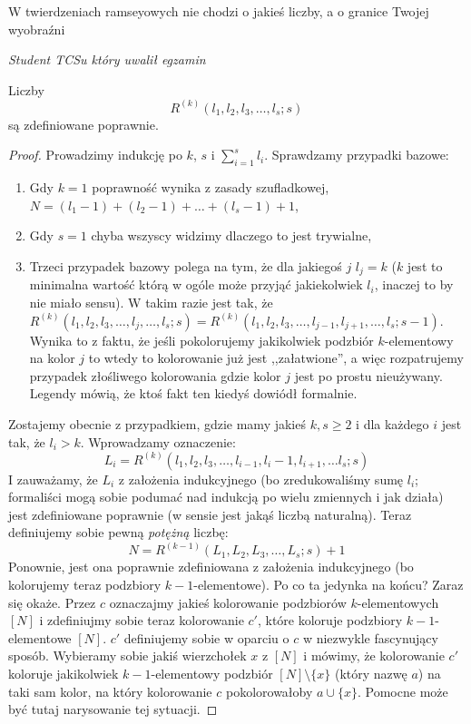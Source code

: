 \epigraph{W twierdzeniach ramseyowych nie chodzi o jakieś liczby, a o granice Twojej wyobraźni}{\textit{Student TCSu który uwalił egzamin}}
\begin{theorem}
	Liczby
	\begin{equation*}
		R^{(k)}(l_1,l_2,l_3,\dots,l_s;s)
	\end{equation*}
	są zdefiniowane poprawnie.
\end{theorem}

\begin{proof}
	Prowadzimy indukcję po $k$, $s$ i $\sum_{i=1}^{s} l_i$. Sprawdzamy przypadki bazowe:
	\begin{enumerate}
		\item Gdy $k = 1$ poprawność wynika z zasady szufladkowej, $N = (l_1 - 1) + (l_2 - 1) + \dots + (l_s - 1) + 1$,
		\item Gdy $s = 1$ chyba wszyscy widzimy dlaczego to jest trywialne,
		\item Trzeci przypadek bazowy polega na tym, że dla jakiegoś $j$ $l_j = k$ ($k$ jest to minimalna wartość którą w ogóle może przyjąć jakiekolwiek $l_i$, inaczej to by nie miało sensu). W takim razie jest tak, że $R^{(k)}(l_1,l_2,l_3,\dots,l_j,\dots,l_s;s) = R^{(k)}(l_1,l_2,l_3,\dots,l_{j-1}, l_{j+1}, \dots,l_s;s-1)$. Wynika to z faktu, że jeśli pokolorujemy jakikolwiek podzbiór $k$-elementowy na kolor $j$ to wtedy to kolorowanie już jest ,,załatwione'', a więc rozpatrujemy przypadek złośliwego kolorowania gdzie kolor $j$ jest po prostu nieużywany. Legendy mówią, że ktoś fakt ten kiedyś dowiódł formalnie.
	\end{enumerate}

	Zostajemy obecnie z przypadkiem, gdzie mamy jakieś $k, s \geq 2$ i dla każdego $i$ jest tak, że $l_i > k$. Wprowadzamy oznaczenie:
	\begin{equation*}
		L_i = R^{(k)}(l_1,l_2,l_3,\dots, l_{i-1}, l_i - 1, l_{i+1}, \dots l_s;s)
	\end{equation*}
	I zauważamy, że $L_i$ z założenia indukcyjnego (bo zredukowaliśmy sumę $l_i$; formaliści mogą sobie podumać nad indukcją po wielu zmiennych i jak działa) jest zdefiniowane poprawnie (w sensie jest jakąś liczbą naturalną). Teraz definiujemy sobie pewną \textit{potężną} liczbę:
	\begin{equation*}
		N = R^{(k-1)}(L_1, L_2, L_3, \dots, L_s; s) + 1
	\end{equation*}
	Ponownie, jest ona poprawnie zdefiniowana z założenia indukcyjnego (bo kolorujemy teraz podzbiory $k-1$-elementowe). Po co ta jedynka na końcu? Zaraz się okaże. Przez $c$ oznaczajmy jakieś kolorowanie podzbiorów $k$-elementowych $[N]$ i zdefiniujmy sobie teraz kolorowanie $c'$, które koloruje podzbiory $k-1$-elementowe $[N]$. $c'$ definiujemy sobie w oparciu o $c$ w niezwykle fascynujący sposób. Wybieramy sobie jakiś wierzchołek $x$ z $[N]$ i mówimy, że kolorowanie $c'$ koloruje jakikolwiek $k-1$-elementowy podzbiór $[N] \setminus \{x\}$ (który nazwę $a$) na taki sam kolor, na który kolorowanie $c$ pokolorowałoby $a \cup \{x\}$. Pomocne może być tutaj narysowanie tej sytuacji.


\end{proof}
